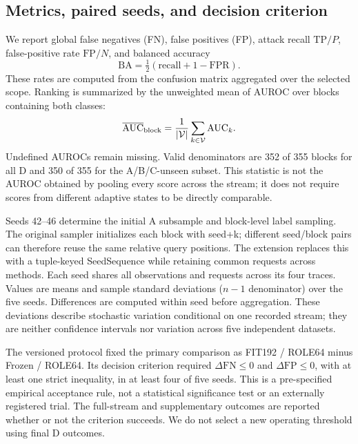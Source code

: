 \subsection{Metrics, paired seeds, and decision criterion}
We report global false negatives (FN), false positives (FP), attack recall $\mathrm{TP}/P$, false-positive rate $\mathrm{FP}/N$, and balanced accuracy
\begin{equation}
 \mathrm{BA}=\tfrac12\left(\mathrm{recall}+1-\mathrm{FPR}\right).
\end{equation}
These rates are computed from the confusion matrix aggregated over the selected scope. Ranking is summarized by the unweighted mean of AUROC over blocks containing both classes:
\begin{equation}
 \overline{\mathrm{AUC}}_{\mathrm{block}}=\frac{1}{|\mathcal{V}|}\sum_{k\in\mathcal{V}}\mathrm{AUC}_k.
\end{equation}
Undefined AUROCs remain missing. Valid denominators are 352 of 355 blocks for all D and 350 of 355 for the A/B/C-unseen subset. This statistic is not the AUROC obtained by pooling every score across the stream; it does not require scores from different adaptive states to be directly comparable.

Seeds 42--46 determine the initial A subsample and block-level label sampling. The original sampler initializes each block with seed+k; different seed/block pairs can therefore reuse the same relative query positions. The extension replaces this with a tuple-keyed SeedSequence while retaining common requests across methods. Each seed shares all observations and requests across its four traces. Values are means and sample standard deviations ($n-1$ denominator) over the five seeds. Differences are computed within seed before aggregation. These deviations describe stochastic variation conditional on one recorded stream; they are neither confidence intervals nor variation across five independent datasets.

The versioned protocol fixed the primary comparison as FIT192 / ROLE64 minus Frozen / ROLE64. Its decision criterion required $\Delta\mathrm{FN}\leq0$ and $\Delta\mathrm{FP}\leq0$, with at least one strict inequality, in at least four of five seeds. This is a pre-specified empirical acceptance rule, not a statistical significance test or an externally registered trial. The full-stream and supplementary outcomes are reported whether or not the criterion succeeds. We do not select a new operating threshold using final D outcomes.

